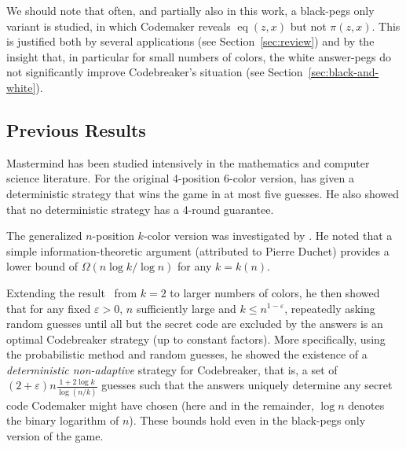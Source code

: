 \documentclass[english,a4paper,11pt]{article}
\newcommand{\eps}{{\varepsilon}}
\DeclareMathOperator{\eq}{eq}
\newcommand{\ifLongCites}[2]{#1}
\newcommand{\ifLongCites}[2]{#2}
\begin{document}
{We should note that often, and partially also in this work, a black-pegs only variant is studied, in which Codemaker reveals $\eq(z,x)$ but not $\pi(z,x)$. This is justified both by several applications (see Section~\ref{sec:review}) and by the insight that, in particular for small numbers of colors, the white answer-pegs do not significantly improve Codebreaker's situation (see Section~\ref{sec:black-and-white}). 



\subsection{Previous Results}\label{sec:previous}

Mastermind has been studied intensively in the mathematics and computer science literature. For the original 4-position 6-color version, \ifLongCites{\cite{Knuth77}}{Knuth~\cite{Knuth77}} has given a deterministic strategy that wins the game in at most five guesses. He also showed that no deterministic strategy has a 4-round guarantee.

The generalized $n$-position $k$-color version was investigated by \ifLongCites{\cite{Chvatal83}}{Chv\'atal~\cite{Chvatal83}}. He 
noted that a simple information-theoretic argument (attributed to Pierre Duchet) provides a lower bound of $\Omega(n \log k / \log n)$ for any $k=k(n)$.  

Extending the result\ifLongCites{~\cite{Erd63}}{~\cite{Erd63} of Erd\H os and R\'enyi} from $k=2$ to larger numbers of colors, he then showed that for any fixed $\eps > 0$, $n$ sufficiently large and $k \le n^{1-\eps}$, repeatedly asking random guesses until all but the secret code are excluded by the answers is an optimal Codebreaker strategy (up to constant factors). More specifically, using the probabilistic method and random guesses, he showed the existence of a \emph{deterministic non-adaptive} strategy for Codebreaker, that is,  a  set of $(2+\eps) n \frac{1+2 \log k}{\log (n/k)}$ guesses such that the answers uniquely determine any secret code Codemaker might have chosen (here and in the remainder, $\log n$ denotes the binary logarithm of $n$). These bounds hold even in the black-pegs only version of the game. 

}
\end{document}

